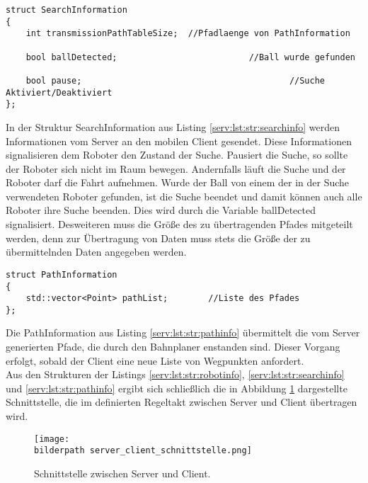 \begin{lstlisting}[frame=tb,captionpos=b,caption={Datenstruktur  SearchInformation.}, label=serv:lst:str:searchinfo]
struct SearchInformation
{
	int transmissionPathTableSize;	//Pfadlaenge von PathInformation

	bool ballDetected;							//Ball wurde gefunden
	
	bool pause;											//Suche Aktiviert/Deaktiviert
};
\end{lstlisting}

In der Struktur SearchInformation aus Listing \ref{serv:lst:str:searchinfo} werden Informationen vom Server an den mobilen Client gesendet. Diese Informationen signalisieren dem Roboter den Zustand der Suche. Pausiert die Suche, so sollte der Roboter sich nicht im Raum bewegen. Andernfalls läuft die Suche und der Roboter darf die Fahrt aufnehmen. Wurde der Ball von einem der in der Suche verwendeten Roboter gefunden, ist die Suche beendet und damit können auch alle Roboter ihre Suche beenden. Dies wird durch die Variable ballDetected signalisiert. Desweiteren muss die Größe des zu übertragenden Pfades mitgeteilt werden, denn zur Übertragung von Daten muss stets die Größe der zu übermittelnden Daten angegeben werden.

\begin{lstlisting}[frame=tb,captionpos=b,caption=Datenstruktur PathInformation., label=serv:lst:str:pathinfo]
struct PathInformation
{
	std::vector<Point> pathList;		//Liste des Pfades
};
\end{lstlisting}

Die PathInformation aus Listing \ref{serv:lst:str:pathinfo} übermittelt die vom Server generierten Pfade, die durch den Bahnplaner enstanden sind. Dieser Vorgang erfolgt, sobald der Client eine neue Liste von Wegpunkten anfordert. \\

Aus den Strukturen der Listings \ref{serv:lst:str:robotinfo},
\ref{serv:lst:str:searchinfo} und \ref{serv:lst:str:pathinfo} ergibt sich
schließlich die in Abbildung \ref{serv:fig:schnittstelle} dargestellte Schnittstelle, die im  definierten Regeltakt zwischen Server und Client übertragen wird.

\begin{figure}[h]
	\centering	
	\texttt{[image: \\bilderpath server\_client\_schnittstelle.png]}
	\caption{Schnittstelle zwischen Server und Client.}
	\label{serv:fig:schnittstelle}
\end{figure}

